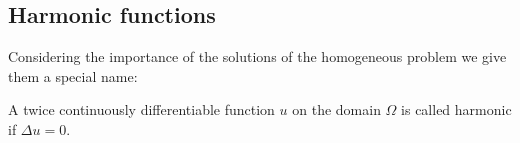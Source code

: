 \subsection{Harmonic functions}
Considering the importance of the solutions of the homogeneous problem
we give them a special name:

\begin{definition}
A twice continuously differentiable function $u$ on the domain $\Omega$
is called harmonic if $\Delta u=0$.
\end{definition}


